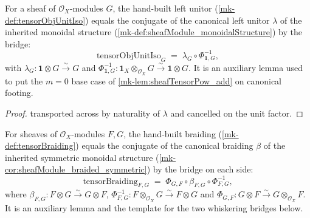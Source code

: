 \begin{lemma}\label{mk-lem:tensorObjUnitIso_eq}
  \leanok

  For a sheaf of \(\mathcal{O}_X\)-modules \(G\), the hand-built left unitor
  (\ref{mk-def:tensorObjUnitIso}) equals the conjugate of the canonical left unitor
  \(\lambda\) of the inherited monoidal structure
  (\ref{mk-def:sheafModule_monoidalStructure}) by the bridge:
  \[
    \mathrm{tensorObjUnitIso}_G
      \;=\; \lambda_G \circ \Phi_{\mathbf{1},G}^{-1},
  \]
  with \(\lambda_G : \mathbf{1} \otimes G \xrightarrow{\sim} G\) and
  \(\Phi_{\mathbf{1},G}^{-1} : \mathbf{1}_X \otimes_{\mathcal{O}_X} G
  \xrightarrow{\sim} \mathbf{1} \otimes G\). It is an auxiliary lemma used to put
  the \(m = 0\) base case of \ref{mk-lem:sheafTensorPow_add} on canonical footing.
\end{lemma}

\begin{proof}
  transported across by naturality of \(\lambda\) and cancelled on the unit
  factor.
\end{proof}

\begin{lemma}\label{mk-lem:tensorBraiding_eq}
  \leanok

  For sheaves of \(\mathcal{O}_X\)-modules \(F, G\), the hand-built braiding
  (\ref{mk-def:tensorBraiding}) equals the conjugate of the canonical braiding
  \(\beta\) of the inherited symmetric monoidal structure
  (\ref{mk-cor:sheafModule_braided_symmetric}) by the bridge on each side:
  \[
    \mathrm{tensorBraiding}_{F,G}
      \;=\; \Phi_{G,F} \circ \beta_{F,G} \circ \Phi_{F,G}^{-1},
  \]
  where \(\beta_{F,G} : F \otimes G \xrightarrow{\sim} G \otimes F\),
  \(\Phi_{F,G}^{-1} : F \otimes_{\mathcal{O}_X} G \xrightarrow{\sim} F \otimes G\)
  and \(\Phi_{G,F} : G \otimes F \xrightarrow{\sim} G \otimes_{\mathcal{O}_X} F\).
  It is an auxiliary lemma and the template for the two whiskering bridges
  below.
\end{lemma}

